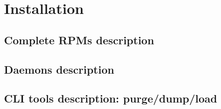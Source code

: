 \section{Installation}
\TODO{}

\subsection{Complete RPMs description}
\subsection{Daemons description}
\subsection{CLI tools description: purge/dump/load}

